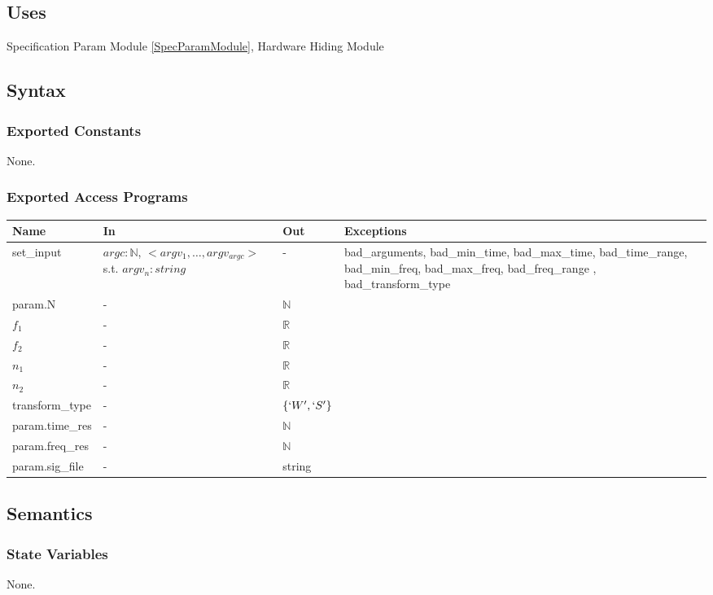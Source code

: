 \documentclass[12pt, titlepage]{article}
\begin{document}
\subsection{Uses}
Specification Param Module \ref{SpecParamModule}, Hardware Hiding Module
\subsection{Syntax}

\subsubsection{Exported Constants}
None.
\subsubsection{Exported Access Programs}

\begin{center}
\begin{tabular}{p{3cm} p{3cm} p{2cm} p{3cm}}
\hline
\textbf{Name} & \textbf{In} & \textbf{Out} & \textbf{Exceptions} \\
\hline
set\_input & $argc: \mathbb{N}$, $<argv_1, \dots, argv_{argc}>$ s.t. $argv_n : string$& - & bad\_arguments, bad\_min\_time, bad\_max\_time, bad\_time\_range, bad\_min\_freq, bad\_max\_freq, bad\_freq\_range , bad\_transform\_type \\
param.N & - &$\mathbb{N}$ & \\
$f_1$ &  - &$\mathbb{R}$ & \\
$f_2$ & - & $\mathbb{R}$ &  \\
$n_1$ & - & $\mathbb{R}$ & \\
$n_2$ & - & $\mathbb{R}$ & \\
transform\_type & - & $\{`W', `S'\}$ &  \\
param.time\_res & - & $\mathbb{N} $&\\
param.freq\_res & - &$\mathbb{N}$ & \\
param.sig\_file & - & string & \\
\hline
\end{tabular}
\end{center}

\subsection{Semantics}

\subsubsection{State Variables}
None.
\end{document}
